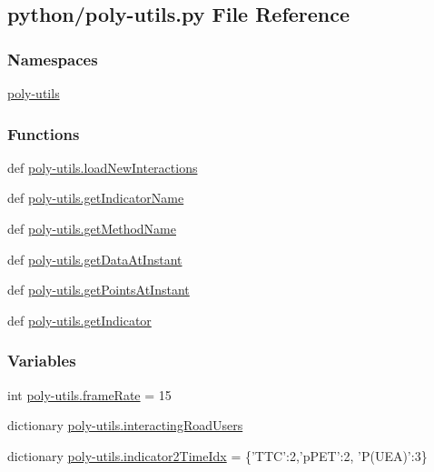 \hypertarget{poly-utils_8py}{\subsection{python/poly-\/utils.py File Reference}
\label{poly-utils_8py}
}
\subsubsection*{Namespaces}
\begin{DoxyCompactItemize}
\item 
\hyperlink{namespacepoly-utils}{poly-\/utils}
\end{DoxyCompactItemize}
\subsubsection*{Functions}
\begin{DoxyCompactItemize}
\item 
def \hyperlink{namespacepoly-utils_a60efdaca1080b0d32d58bdc6d435d133}{poly-\/utils.\-load\-New\-Interactions}
\item 
def \hyperlink{namespacepoly-utils_a49efcbf137da6572ebc75f06d4512a96}{poly-\/utils.\-get\-Indicator\-Name}
\item 
def \hyperlink{namespacepoly-utils_a49869f8abcbf1f79e67fc28df7cc3859}{poly-\/utils.\-get\-Method\-Name}
\item 
def \hyperlink{namespacepoly-utils_a1cd891e846eab48097b552c38a7c7a82}{poly-\/utils.\-get\-Data\-At\-Instant}
\item 
def \hyperlink{namespacepoly-utils_a0b1a2783fe6ce5e4b9e02c30074e7405}{poly-\/utils.\-get\-Points\-At\-Instant}
\item 
def \hyperlink{namespacepoly-utils_a266b8380e78ab7072f8660f1c2535faf}{poly-\/utils.\-get\-Indicator}
\end{DoxyCompactItemize}
\subsubsection*{Variables}
\begin{DoxyCompactItemize}
\item 
int \hyperlink{namespacepoly-utils_afd6fd6883ca01f5c35efbd65a12e4ac1}{poly-\/utils.\-frame\-Rate} = 15
\item 
dictionary \hyperlink{namespacepoly-utils_adf6aa542a17dc9d5d13a19e44c9425c0}{poly-\/utils.\-interacting\-Road\-Users}
\item 
dictionary \hyperlink{namespacepoly-utils_a0e845d97dbbcae36f39bd832c890ad7a}{poly-\/utils.\-indicator2\-Time\-Idx} = \{'T\-T\-C'\-:2,'p\-P\-E\-T'\-:2, 'P(U\-E\-A)'\-:3\}
\end{DoxyCompactItemize}
